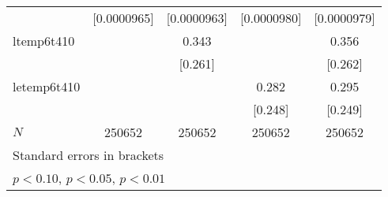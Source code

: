 {\begin{tabular}{l*{4}{c}}
            & [0.0000965]         & [0.0000963]         & [0.0000980]         & [0.0000979]         \\
[1em]
ltemp6t410  &                     &       0.343         &                     &       0.356         \\
            &                     &     [0.261]         &                     &     [0.262]         \\
[1em]
letemp6t410 &                     &                     &       0.282         &       0.295         \\
            &                     &                     &     [0.248]         &     [0.249]         \\
\hline
\(N\)       &      250652         &      250652         &      250652         &      250652         \\
\hline\hline
\multicolumn{5}{l}{\footnotesize Standard errors in brackets}\\
\multicolumn{5}{l}{\footnotesize \sym{*} \(p<0.10\), \sym{**} \(p<0.05\), \sym{***} \(p<0.01\)}\\
\end{tabular}
}
